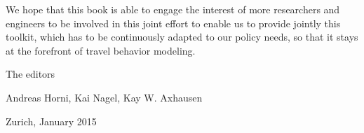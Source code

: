 We hope that this book is able to engage the interest of more researchers and engineers to be involved in this joint effort to enable us to provide jointly this toolkit, which has to be continuously adapted to our policy needs, so that it stays at the forefront of travel behavior modeling.

The editors

Andreas Horni, 	Kai Nagel,		Kay W. Axhausen

Zurich, January 2015

